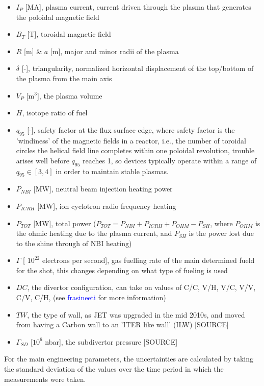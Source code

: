 \documentclass[a4paper, twoside, final, 12pt]{article}
\begin{document}
\begin{itemize}
	\item $I_P$ [MA], plasma current, current driven through the plasma that generates the poloidal magnetic field
	\item $B_T$ [T], toroidal magnetic field 
	\item $R$ [m] \& $a$ [m], major and minor radii of the plasma
	\item $\delta$ [-], triangularity, normalized horizontal displacement of the top/bottom of the plasma from the main axis
	\item $V_P$ [m$^3$], the plasma volume
	\item $H$, isotope ratio of fuel
	\item $q_{95}$ [-], safety factor at the flux surface edge, where safety factor is the 'windiness' of the magnetic fields in a reactor, i.e., the  number of toroidal circles the helical field line completes within one poloidal revolution, trouble arises well before $q_{95}$ reaches 1, so devices typically operate within a range of $q_{95} \in [3, 4]$ in order to maintain stable plasmas.
	\item $P_{NBI}$ [MW], neutral beam injection heating power
	\item $P_{ICRH}$ [MW], ion cyclotron radio frequency heating 
	\item $P_{TOT}$ [MW], total power ($P_{TOT} = P_{NBI}+ P_{ICRH} + P_{OHM} - P_{SH}$, where $P_{OHM}$ is the ohmic heating due to the plasma current, and $P_{SH}$ is the power lost due to the shine through of NBI heating)
	\item $\Gamma$ [ $10^{22}$ electrons per second], gas fuelling rate of the main determined fueld for the shot, this changes depending on what type of fueling is used 
	\item $DC$, the divertor configuration, can take on values of C/C, V/H, V/C, V/V, C/V, C/H, (see \textcolor{blue}{frasineeti} for more information)
	\item $TW$, the type of wall, as JET was upgraded in the mid 2010s, and moved from having a Carbon wall to an 'ITER like wall' (ILW) [SOURCE]
	\item $\Gamma_{SD}$ [$10^6$ nbar], the subdivertor pressure [SOURCE]
\end{itemize}

For the main engineering parameters, the uncertainties are calculated by taking the standard deviation of the values over the time period in which the measurements were taken. 
\end{document}
